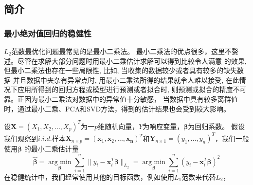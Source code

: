 \subsection{简介}
\subsubsection{最小绝对值回归的稳健性}

$L_2$范数最优化问题最常见的是最小二乘法。
最小二乘法的优点很多，这里不赘述。尽管在求解大部分问题时用最小二乘估计求解可以得到比较令人满意
的效果, 但最小二乘法也存在一些局限性, 比如, 当收集的数据较少或者具有较多的缺失数据
并且数据中夹杂有异常点时, 用最小二乘法所得的结果就令人难以接受, 在此情况下应用所得到的回归方程或模型进行预测或者拟合时, 
则预测或拟合的精度不可靠。正因为最小二乘法对数据中的异常值十分敏感，
当数据中具有较多离群值时，通过最小二乘、PCA和SVD方法，得到的估计结果也会受到较大影响。

设$\bm{X} = (X_1, X_2, ..., X_p)^T$为一$p$维随机向量，$Y$为响应变量，$\bm{\beta}$为回归系数。
假设我们观察到$i.i.d. $样本$\bm{X}_{n\times p} = (\bm{x}_1, \bm{x}_2, ..., \bm{x_n})^T$和$\bm{Y}_{n\times1}=
(y_1, ..., y_n)^T$，我们一般使用$\bm{\beta}$
的最小二乘估计量
\begin{equation}\label{l2loss}
\hat{\bm{\beta}} = \underset{\bm{\beta}}{\operatorname{arg\ min}} \sum_{i=1}^n\|y_i - \bm{x}^T_i\bm{\beta}\|_{L_2}
=\underset{\bm{\beta}}{\operatorname{arg\ min}} \sum_{i=1}^n(y_i - \bm{x}^T_i\bm{\beta})^2
\end{equation}
在稳健统计中，我们经常使用其他的目标函数，例如使用$L_1$范数来代替$L_2$，

